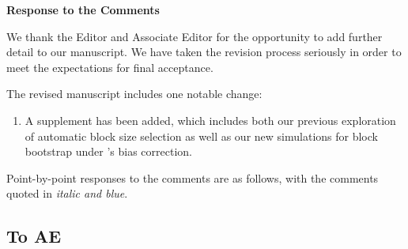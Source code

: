 \documentclass[12pt]{article}
\begin{document}
\begin{center}
  {\Large\bf Response to the Comments}
\end{center}


We thank the Editor and Associate Editor for the opportunity to add further detail to our manuscript.
We have taken the revision process seriously in order
to meet the expectations for final acceptance.


The revised manuscript includes one notable change:
\begin{enumerate}
\item A supplement has been added, which includes both
our previous exploration of automatic block size selection as
well as our new simulations for block bootstrap under
\citet{babu2004goodness}'s bias correction.
\end{enumerate}


Point-by-point responses to the comments are as follows, with the
comments quoted in \emph{\color{darkblue} italic and blue}.


\subsection*{To AE}
\end{document}
